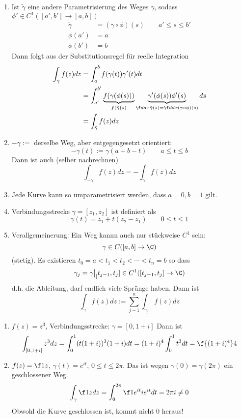 \documentclass[a4paper,10pt]{scrartcl}
\begin{document}
\begin{nt}
	\label{st:1.28}
	\begin{enumerate}[1)]
		\item 
			Ist $\tilde \gamma$ eine andere Parametrisierung des Weges $\gamma$, sodass $\phi'\in C^1([a',b']\to [a,b])$
			\begin{align*}
				\tilde \gamma &= (\gamma \circ \phi)(s) \qquad a'\le s\le b'\\
				\phi(a') &= a\\
				\phi(b') &= b
			\end{align*}
			Dann folgt aus der Substitutionsregel für reelle Integration
			\begin{align*}
				\int_\gamma f(z) dz &= \int_a^b f(\gamma(t)) \gamma'(t) dt \\
				&= \int_{a'}^{b'} \underbrace{f(\gamma(\phi(s)))}_{f(\tilde \gamma(s)} \underbrace{\gamma'(\phi(s))\phi'(s)}_{\f d{dx}\tilde \gamma(s)=\f d{dx}(\gamma\circ \phi)(s)} ds\\
				&= \int_{\tilde \gamma} f(z) dz
			\end{align*}
		\item
			$-\gamma := $  derselbe Weg, aber entgegengesetzt orientiert:
			\[
				-\gamma(t) := \gamma(a+b-t) \qquad a\le t\le b
			\]
			Dann ist auch (selber nachrechnen)
			\[
				\int_{-\gamma}f(z) dz = - \int_\gamma f(z) dz
			\]
		\item
			Jede Kurve kann so umparametrisiert werden, dass $a=0, b=1$ gilt.
		\item
			Verbindungsstrecke $\gamma=[z_1,z_2]$ ist definiert als
			\[
				\gamma(t) = z_1 + t(z_2-z_1) \qquad 0\le t\le 1
			\]
		\item
			Verallgemeinerung: Ein Weg kannn auch nur stückweise $C^1$ sein:
			\[
				\gamma\in C([a,b]\to \C)
			\]
			(stetig).
			Es existieren $t_0=a<t_1<t_2<\dotsb<t_n=b$ so dass
			\[
				\gamma_j = \gamma\big|_[t_{j-1},t_j] \in C^1([t_{j-1},t_j]\to \C)
			\]
			d.h. die Ableitung, darf endlich viele Sprünge haben.
			Dann ist
			\[
				\int_\gamma f(z) dz := \sum_{j-1}^n \int_{\gamma_j}f(z) dz
			\]
	\end{enumerate}
\end{nt}

\begin{ex}
	\begin{enumerate}[1)]
		\item 
			$f(z)=z^3$, Verbindungsstrecke: $\gamma=[0,1+i]$
			Dann ist
			\[
				\int_{[0,1+i]}z^3 dz = \int_0^1(t(1+i))^3(1+i) dt = (1+i)^4 \int_0^1 t^3 dt = \f {(1+i)^4}4
			\]
		\item
			$f(z)=\f 1z$, $\gamma(t)=e^{it}$, $0\le t\le 2\pi$.
			Das ist wegen $\gamma(0)=\gamma(2\pi)$ ein geschlossener Weg.
			\[
				\int_\gamma \f 1z dz = \int_0^{2\pi}\f 1{e^{it}} ie^{it} dt = 2\pi i \neq 0 
			\]
			Obwohl die Kurve geschlossen ist, kommt nicht $0$ heraus!
	\end{enumerate}
\end{ex}
\end{document}
